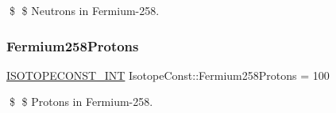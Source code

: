 \$ \$ Neutrons in Fermium-\/258. \mbox{\label{group___isotope_const-_fermium-_fm258_ga4fbe8e56c5d0de9fbb5d10cf72da4d2a}} 
\subsubsection{\texorpdfstring{Fermium258\+Protons}{Fermium258Protons}}
{\footnotesize\ttfamily \mbox{\hyperlink{group___isotope_const-_macros_ga5f18360b3e99483a35c32d789e62621c}{I\+S\+O\+T\+O\+P\+E\+C\+O\+N\+S\+T\+\_\+\+I\+NT}} Isotope\+Const\+::\+Fermium258\+Protons = 100}

\$ \$ Protons in Fermium-\/258. 